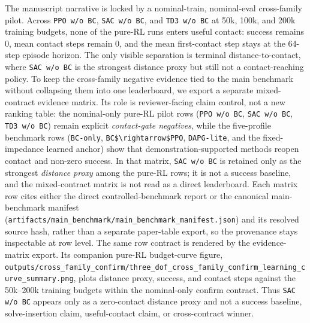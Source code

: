 ﻿\documentclass[11pt]{article}
\newcommand{\code}[1]{\nolinkurl{#1}}
\begin{document}
The manuscript narrative is locked by a nominal-train, nominal-eval cross-family pilot.
Across \code{PPO w/o BC}, \code{SAC w/o BC}, and \code{TD3 w/o BC} at 50k, 100k, and 200k
training budgets, none of the pure-RL runs enters useful contact: success remains 0, mean contact
steps remain 0, and the mean first-contact step stays at the 64-step episode horizon. The only
visible separation is terminal distance-to-contact, where \code{SAC w/o BC} is the strongest
distance proxy but still not a contact-reaching policy. To keep the cross-family negative evidence
tied to the main benchmark without collapsing them into
one leaderboard, we export a separate mixed-contract evidence matrix. Its role is reviewer-facing
claim control, not a new ranking table: the nominal-only pure-RL pilot rows
(\code{PPO w/o BC}, \code{SAC w/o BC}, \code{TD3 w/o BC}) remain explicit
\emph{contact-gate negatives}, while the five-profile benchmark rows
(\code{BC-only}, \code{BC$\rightarrow$PPO}, \code{DAPG-lite}, and the fixed-impedance learned anchor)
show that demonstration-supported methods reopen contact and non-zero success. In that matrix,
\code{SAC w/o BC} is retained only as the strongest \emph{distance proxy} among the pure-RL rows;
it is not a success baseline, and the mixed-contract matrix is not read as a direct leaderboard.
Each matrix row cites either the direct controlled-benchmark report or the canonical main-benchmark manifest
(\code{artifacts/main_benchmark/main_benchmark_manifest.json}) and its resolved source hash,
rather than a separate paper-table export, so the provenance stays inspectable at row level.
The same row contract is rendered by the evidence-matrix export. Its companion pure-RL budget-curve figure,
\code{outputs/cross_family_confirm/three_dof_cross_family_confirm_learning_curve_summary.png},
plots distance proxy, success, and contact steps against the 50k--200k training budgets within the
nominal-only confirm contract. Thus \code{SAC w/o BC} appears only as a zero-contact distance
proxy and not a success baseline, solve-insertion claim, useful-contact claim, or cross-contract
winner.
\end{document}
